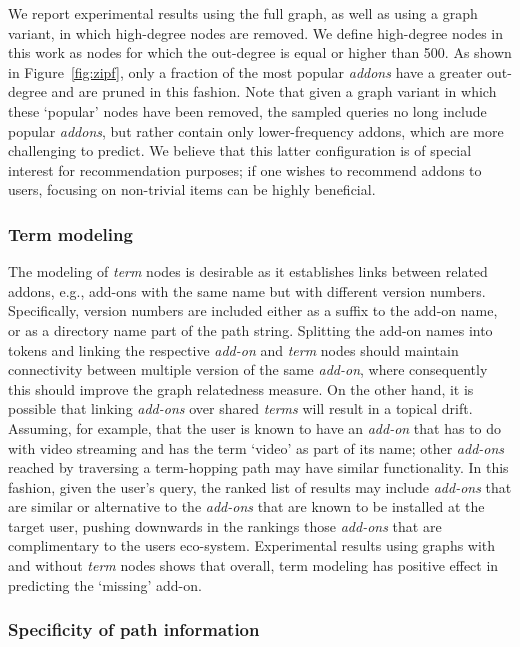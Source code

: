 \documentclass[11pt,oneside]{book}
\let\Oldsubsubsection\subsubsection
\renewcommand{\subsubsection}{\FloatBarrier\Oldsubsubsection}
\begin{document}
We report experimental results using the full graph, as well as using a graph variant, in which high-degree nodes are removed. We define high-degree nodes in this work as nodes for which the out-degree is equal or higher than 500. As shown in Figure~\ref{fig:zipf}, only a fraction of the most popular {\it addons} have a greater out-degree and are pruned in this fashion. Note that given a graph variant in which these `popular' nodes have been removed, the sampled queries no long include popular {\it addons}, but rather contain only lower-frequency addons, which are more challenging to predict. We believe that this latter configuration is of special interest for recommendation purposes; if one wishes to recommend addons to users, focusing on non-trivial items can be highly beneficial.

\subsubsection{Term modeling}

The modeling of {\it term} nodes is desirable as it establishes links between related addons, e.g., add-ons with the same name but with different version numbers. Specifically, version numbers are included either as a suffix to the add-on name, or as a directory name part of the path string. Splitting the add-on names into tokens and linking the respective {\it add-on} and {\it term} nodes should maintain connectivity between multiple version of the same {\it add-on}, where consequently this should improve the graph relatedness measure. On the other hand, it is possible that linking {\it add-ons} over shared {\it terms} will result in a topical drift. Assuming, for example, that the user is known to have an {\it add-on} that has to do with video streaming and has the term `video' as part of its name; other {\it add-ons} reached by traversing a term-hopping path may have similar functionality. In this fashion, given the user's query, the ranked list of results may include {\it add-ons} that are similar or alternative to the {\it add-ons} that are known to be installed at the target user, pushing downwards in the rankings those {\it add-ons} that are complimentary to the users eco-system. Experimental results using graphs with and without {\it term} nodes shows that overall, term modeling has positive effect in predicting the `missing' add-on.

\subsubsection{Specificity of path information} 
\end{document}
